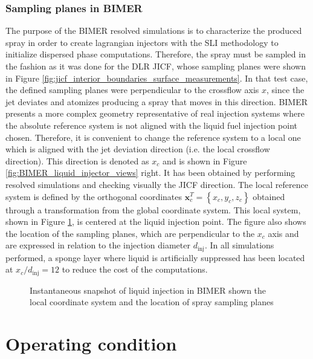 \subsubsection*{Sampling planes in BIMER}

The purpose of the BIMER resolved simulations is to characterize the produced spray in order to create lagrangian injectors with the SLI methodology to initialize dispersed phase computations. Therefore, the spray must be sampled in the fashion as it was done for the DLR JICF, whose sampling planes were shown in Figure \ref{fig:jicf_interior_boundaries_surface_measurements}. In that test case, the defined sampling planes were perpendicular to the crossflow axis $x$, since the jet deviates and atomizes producing a spray that moves in this direction. BIMER presents a more complex geometry representative of real injection systems where the absolute reference system is not aligned with the liquid fuel injection point chosen. Therefore, it is convenient to change the reference system to a local one which is aligned with the jet deviation direction (i.e. the local crossflow direction). This direction is denoted as $x_c$ and is shown in Figure \ref{fig:BIMER_liquid_injector_views} right. It has been obtained by performing resolved simulations and checking visually the JICF direction. The local reference system is defined by the orthogonal coordinates $\textbf{x}_c^T =\left\lbrace x_c, y_c, z_c \right\rbrace$ obtained through a transformation from the global coordinate system. This local system, shown in Figure \ref{fig:BIMER_local_FoR_and_sampling_planes}, is centered at the liquid injection point. The figure also shows the location of the sampling planes, which are perpendicular to the $x_c$ axis and are expressed in relation to the injection diameter $d_\mathrm{inj}$. In all simulations performed, a sponge layer where liquid is artificially suppressed has been located at $x_c/d_\mathrm{inj} = 12$ to reduce the cost of the computations.

\begin{figure}[h!]
	\centering
	\caption{Instantaneous snapshot of liquid injection in BIMER shown the local coordinate system and the location of spray sampling planes}	\label{fig:BIMER_local_FoR_and_sampling_planes}
\end{figure}


\section{Operating condition}
\label{sec:ch8_BIMER_operating_condition}

